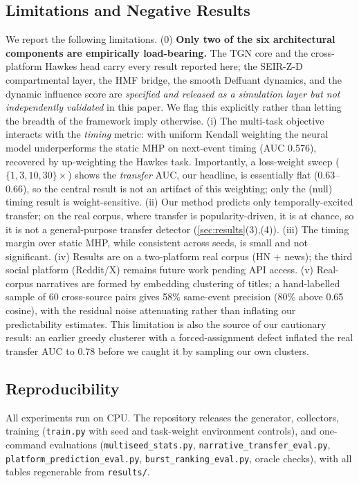 \documentclass[11pt]{article}
\begin{document}
\subsection{Limitations and Negative Results}
\label{sec:limitations}

We report the following limitations. (0) \textbf{Only two of the six
architectural components are empirically load-bearing.} The TGN core and the
cross-platform Hawkes head carry every result reported here; the SEIR-Z-D
compartmental layer, the HMF bridge, the smooth Deffuant dynamics, and the
dynamic influence score are \emph{specified and released as a simulation
layer but not independently validated} in this paper. We flag this explicitly
rather than letting the breadth of the framework imply otherwise. (i) The multi-task
objective interacts with the \emph{timing} metric: with uniform Kendall
weighting the neural model underperforms the static MHP on next-event timing
(AUC 0.576), recovered by up-weighting the Hawkes task. Importantly, a
loss-weight sweep ($\{1,3,10,30\}\times$) shows the \emph{transfer} AUC, our
headline, is essentially flat (0.63--0.66), so the central result is not an
artifact of this weighting; only the (null) timing result is weight-sensitive. (ii) Our method predicts only
temporally-excited transfer; on the real corpus, where transfer is
popularity-driven, it is at chance, so it is not a general-purpose transfer
detector (\cref{sec:results}(3),(4)). (iii) The timing margin over static MHP,
while consistent across seeds, is small and not significant. (iv) Results are
on a two-platform real corpus (HN + news); the third social platform (Reddit/X)
remains future work pending API access. (v) Real-corpus narratives are formed
by embedding clustering of titles; a hand-labelled sample of 60 cross-source
pairs gives 58\% same-event precision (80\% above 0.65 cosine), with the
residual noise attenuating rather than inflating our predictability estimates.
This limitation is also the source of our cautionary result: an earlier greedy
clusterer with a forced-assignment defect inflated the real transfer AUC to
$0.78$ before we caught it by sampling our own clusters.

\subsection{Reproducibility}
All experiments run on CPU. The repository releases the generator, collectors,
training (\texttt{train.py} with seed and task-weight environment controls),
and one-command evaluations (\texttt{multiseed\_stats.py},
\texttt{narrative\_transfer\_eval.py}, \texttt{platform\_prediction\_eval.py},
\texttt{burst\_ranking\_eval.py}, oracle checks), with all tables regenerable
from \texttt{results/}.
\end{document}
